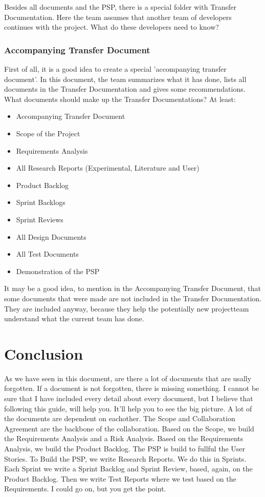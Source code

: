\documentclass[10pt]{report}
\begin{document}
Besides all documents and the PSP, there is a special folder with Transfer Documentation. Here the team assumes that another team of developers continues with the project. What do these developers need to know?

\subsection{Accompanying Transfer Document}

 First of all, it is a good idea to create a special 'accompanying transfer document'. In this document, the team summarizes what it has done, lists all documents in the Transfer Documentation and gives some recommendations. What documents should make up the Transfer Documentations? At least:

\begin{itemize}
	\item Accompanying Transfer Document
	\item Scope of the Project
	\item Requirements Analysis
	\item All Research Reports (Experimental, Literature and User)
	\item Product Backlog
	\item Sprint Backlogs
	\item Sprint Reviews
	\item All Design Documents
	\item All Test Documents
	\item Demonstration of the PSP
\end{itemize}

It may be a good idea, to mention in the Accompanying Transfer Document, that some documents that were made are not included in the Transfer Documentation. They are included anyway, because they help the potentially new projectteam understand what the current team has done.

\newpage

\chapter{Conclusion}
\thispagestyle{fancy}

As we have seen in this document, are there a lot of documents that are usally forgotten. If a document is not forgotten, there is missing something. I cannot be sure that I have included every detail about every document, but I believe that following this guide, will help you. It'll help you to see the big picture. A lot of the documents are dependent on eachother. The Scope and Collaboration Agreement are the backbone of the collaboration. Based on the Scope, we build the Requirements Analysis and a Risk Analysis. Based on the Requirements Analysis, we build the Product Backlog. The PSP is build to fullful the User Stories. To Build the PSP, we write Research Reports. We do this in Sprints. Each Sprint we write a Sprint Backlog and Sprint Review, based, again, on the Product Backlog. Then we write Test Reports where we test based on the Requirements. I could go on, but you get the point.
\end{document}
